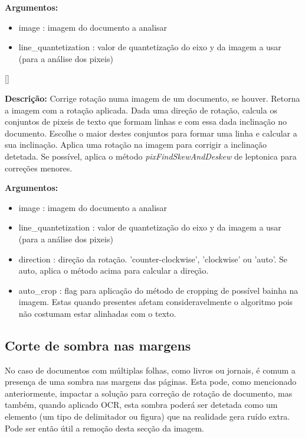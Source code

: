 \textbf{Argumentos:}
\begin{itemize}\setlength\itemsep{-0.3em}
	\item image : imagem do documento a analisar
	\item line\_quantetization : valor de quantetização do eixo y da imagem a usar (para a análise dos pixeis) 
\end{itemize}

[\normalsize]

\textbf{Descrição:} Corrige rotação numa imagem de um documento, se houver. Retorna a imagem com a rotação aplicada. Dada uma direção de rotação, calcula os conjuntos de pixeis de texto que formam linhas e com essa dada inclinação no documento. Escolhe o maior destes conjuntos para formar uma linha e calcular a sua inclinação. Aplica uma rotação na imagem para corrigir a inclinação detetada. 
Se possível, aplica o método \textit{pixFindSkewAndDeskew} de leptonica para correções menores.

\textbf{Argumentos:}
\begin{itemize}\setlength\itemsep{-0.3em}
	\item image : imagem do documento a analisar
	\item line\_quantetization : valor de quantetização do eixo y da imagem a usar (para a análise dos pixeis) 
	\item direction : direção da rotação. 'counter-clockwise', 'clockwise' ou 'auto'. Se auto, aplica o método acima para calcular a direção.
	\item auto\_crop : flag para aplicação do método de cropping de possível bainha na imagem. Estas quando presentes afetam consideravelmente o algoritmo pois não costumam estar alinhadas com o texto.
\end{itemize}

\subsection{Corte de sombra nas margens}
\label{contribution_image_cut_argin_shadow}

No caso de documentos com múltiplas folhas, como livros ou jornais, é comum a presença de uma sombra nas margens das páginas. Esta pode, como mencionado anteriormente, impactar a solução para correção de rotação de documento, mas também, quando aplicado OCR, esta sombra poderá ser detetada como um elemento (um tipo de delimitador ou figura) que na realidade gera ruído extra. Pode ser então útil a remoção desta secção da imagem.

